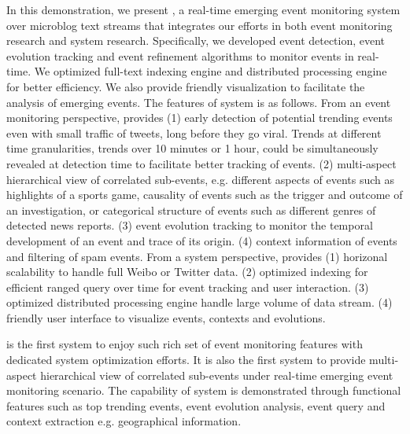 In this demonstration, we present \ring, a real-time emerging event monitoring system over microblog text streams that integrates our efforts in both event monitoring research and system research.
Specifically, we developed event detection, event evolution tracking and event refinement algorithms to monitor events in real-time.
We optimized full-text indexing engine and distributed processing engine for better efficiency.
We also provide friendly visualization to facilitate the analysis of emerging events.
The features of \ring system is as follows.
From an event monitoring perspective, \ring provides
(1) early detection of potential trending events even with small traffic of tweets, long before they go viral. Trends at different time granularities, \ie trends over 10 minutes or 1 hour, could be simultaneously revealed at detection time to facilitate better tracking of events.
(2) multi-aspect hierarchical view of correlated sub-events, e.g. different aspects of events such as highlights of a sports game, causality of events such as the trigger and outcome of an investigation, or categorical structure of events such as different genres of detected news reports.
(3) event evolution tracking to monitor the temporal development of an event and trace of its origin.
(4) context information of events and filtering of spam events.
From a system perspective, \ring provides
(1) horizonal scalability to handle full Weibo or Twitter data.
(2) optimized indexing for efficient ranged query over time for event tracking and user interaction.
(3) optimized distributed processing engine handle large volume of data stream.
(4) friendly user interface to visualize events, contexts and evolutions.

\ring is the first system to enjoy such rich set of event monitoring features with dedicated system optimization efforts.
It is also the first system to provide multi-aspect hierarchical view of correlated sub-events under real-time emerging event monitoring scenario.
The capability of \ring system is demonstrated through functional features such as top trending events, event evolution analysis, event query and context extraction e.g. geographical information.

